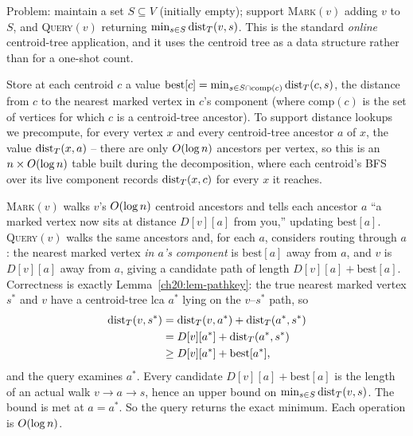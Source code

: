 Problem: maintain a set $S\subseteq V$ (initially empty); support
\textsc{Mark}$(v)$ adding $v$ to $S$, and \textsc{Query}$(v)$ returning
$\min_{s\in S}\operatorname{dist}_T(v,s)$. This is the standard \emph{online} centroid-tree
application, and it uses the centroid tree as a data structure rather than for a one-shot count.

Store at each centroid $c$ a value $\mathrm{best}[c]=\min_{s\in S\cap
\mathrm{comp}(c)}\operatorname{dist}_T(c,s)$, the distance from $c$ to the nearest marked vertex
in $c$'s component (where $\mathrm{comp}(c)$ is the set of vertices for which $c$ is
a centroid-tree ancestor). To support distance lookups we precompute, for every
vertex $x$ and every centroid-tree ancestor $a$ of $x$, the value
$\operatorname{dist}_T(x,a)$ -- there are only $O(\log n)$ ancestors per vertex, so this is an
$n\times O(\log n)$ table built during the decomposition, where each centroid's
BFS over its live component records $\operatorname{dist}_T(x,c)$ for every $x$ it reaches.

\begin{algorithm}[H]
\caption{Nearest marked vertex (Pattern B)}
\label{ch20:alg-nearest}
\DontPrintSemicolon
{}
\end{algorithm}

\begin{whybox}
\textsc{Mark}$(v)$ walks $v$'s $O(\log n)$ centroid ancestors and tells each
ancestor $a$ ``a marked vertex now sits at distance $D[v][a]$ from you,'' updating
$\mathrm{best}[a]$. \textsc{Query}$(v)$ walks the same ancestors and, for each $a$,
considers routing through $a$: the nearest marked vertex \emph{in $a$'s component}
is $\mathrm{best}[a]$ away from $a$, and $v$ is $D[v][a]$ away from $a$, giving a
candidate path of length $D[v][a]+\mathrm{best}[a]$. Correctness is exactly
Lemma~\ref{ch20:lem-pathkey}: the true nearest marked vertex $s^*$ and $v$ have a
centroid-tree lca $a^*$ lying on the $v$--$s^*$ path, so
\begin{align*}
  \operatorname{dist}_T(v,s^*) &= \operatorname{dist}_T(v,a^*) + \operatorname{dist}_T(a^*,s^*) \\
  &= D[v][a^*] + \operatorname{dist}_T(a^*,s^*) \\
  &\ge D[v][a^*] + \mathrm{best}[a^*],
\end{align*}
and the query examines $a^*$. Every candidate
$D[v][a]+\mathrm{best}[a]$ is the length of an actual walk $v\to a\to s$, hence an
upper bound on $\min_{s\in S}\operatorname{dist}_T(v,s)$. The bound is met at
$a=a^*$. So the query returns the exact minimum. Each operation is $O(\log n)$.
\end{whybox}

